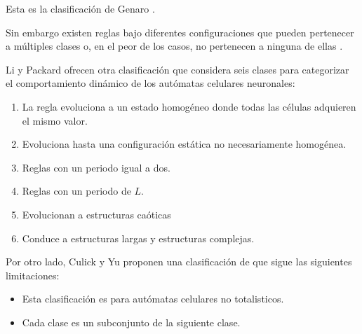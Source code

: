 Esta es la clasificación de Genaro \cite{genClass}.

Sin embargo existen reglas bajo diferentes configuraciones que pueden pertenecer a múltiples clases o, en el peor de los casos, no pertenecen a ninguna de ellas \cite{gen_Life_campoPromedio}. 

Li y Packard ofrecen otra clasificación que considera seis clases para categorizar el comportamiento dinámico de los autómatas celulares neuronales:
\begin{enumerate}[label*=LP\Roman*]
	\item La regla evoluciona a un estado homogéneo donde todas las células adquieren el mismo valor.
	\item Evoluciona hasta una configuración estática no necesariamente homogénea.
	\item Reglas con un periodo igual a dos.
	\item Reglas con un periodo de $L$.
	\item Evolucionan a estructuras caóticas
	\item Conduce a estructuras largas y estructuras complejas.
\end{enumerate}

Por otro lado, Culick y Yu \cite{culick-yu,CAclass2, CAclassification} proponen una clasificación de que sigue las siguientes limitaciones: 

\begin{itemize}
	\item Esta clasificación es para autómatas celulares no totalisticos. 
	\item Cada clase es un subconjunto de la siguiente clase.
\end{itemize}

